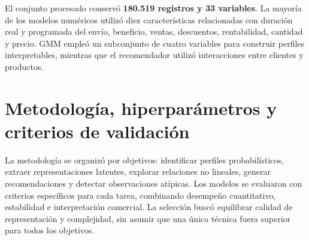 \documentclass[11pt,a4paper]{article}
\begin{document}
El conjunto procesado conservó \textbf{180.519 registros y 33 variables}. La mayoría de los modelos numéricos utilizó diez características relacionadas con duración real y programada del envío, beneficio, ventas, descuentos, rentabilidad, cantidad y precio. GMM empleó un subconjunto de cuatro variables para construir perfiles interpretables, mientras que el recomendador utilizó interacciones entre clientes y productos.

\section{Metodología, hiperparámetros y criterios de validación}
La metodología se organizó por objetivos: identificar perfiles probabilísticos, extraer representaciones latentes, explorar relaciones no lineales, generar recomendaciones y detectar observaciones atípicas. Los modelos se evaluaron con criterios específicos para cada tarea, combinando desempeño cuantitativo, estabilidad e interpretación comercial. La selección buscó equilibrar calidad de representación y complejidad, sin asumir que una única técnica fuera superior para todos los objetivos.
\end{document}
